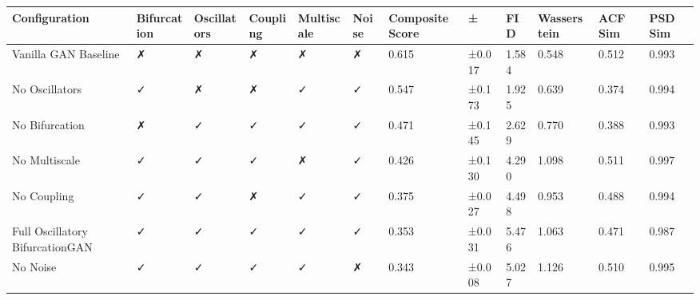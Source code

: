 \begin{tabular}{llllllllllll}
\toprule
Configuration & Bifurcation & Oscillators & Coupling & Multiscale & Noise & Composite Score & ± & FID & Wasserstein & ACF Sim & PSD Sim \\
\midrule
Vanilla GAN Baseline & ✗ & ✗ & ✗ & ✗ & ✗ & 0.615 & ±0.017 & 1.584 & 0.548 & 0.512 & 0.993 \\
No Oscillators & ✓ & ✗ & ✗ & ✓ & ✓ & 0.547 & ±0.173 & 1.925 & 0.639 & 0.374 & 0.994 \\
No Bifurcation & ✗ & ✓ & ✓ & ✓ & ✓ & 0.471 & ±0.145 & 2.629 & 0.770 & 0.388 & 0.993 \\
No Multiscale & ✓ & ✓ & ✓ & ✗ & ✓ & 0.426 & ±0.130 & 4.290 & 1.098 & 0.511 & 0.997 \\
No Coupling & ✓ & ✓ & ✗ & ✓ & ✓ & 0.375 & ±0.027 & 4.498 & 0.953 & 0.488 & 0.994 \\
Full Oscillatory BifurcationGAN & ✓ & ✓ & ✓ & ✓ & ✓ & 0.353 & ±0.031 & 5.476 & 1.063 & 0.471 & 0.987 \\
No Noise & ✓ & ✓ & ✓ & ✓ & ✗ & 0.343 & ±0.008 & 5.027 & 1.126 & 0.510 & 0.995 \\
\bottomrule
\end{tabular}
